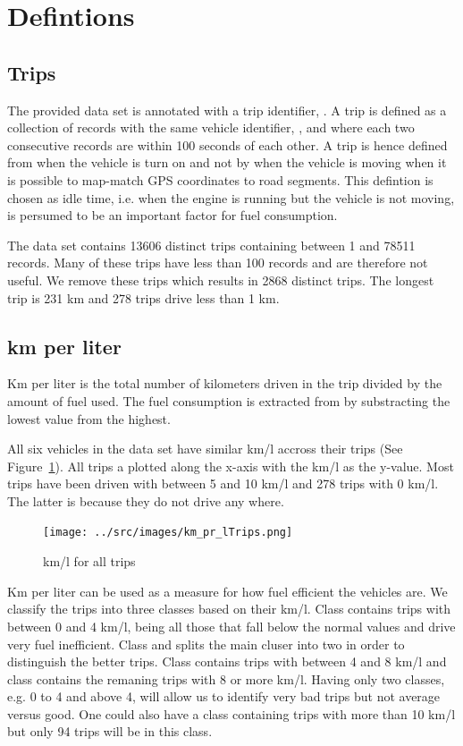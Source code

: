 \section{Defintions}
\subsection{Trips}
The provided data set is annotated with a trip identifier, \tid.
A trip is defined as a collection of records with the same vehicle identifier, \vid, and where each two consecutive records are within 100 seconds of each other.
A trip is hence defined from when the vehicle is turn on and not by when the vehicle is moving when it is possible to map-match GPS coordinates to road segments. 
This defintion is chosen as idle time, i.e. when the engine is running but the vehicle is not moving, is persumed to be an important factor for fuel consumption. 


The data set contains 13606 distinct trips containing between 1 and 78511 records. %
Many of these trips have less than 100 records and are therefore not useful. %
We remove these trips which results in 2868 distinct trips. %
The longest trip is 231 km and 278 trips drive less than 1 km. %


\subsection{km per liter}
Km per liter is the total number of kilometers driven in the trip divided by the amount of fuel used.
The fuel consumption is extracted from  by substracting the lowest value from the highest.

All six vehicles in the data set have similar km/l accross their trips (See Figure~\ref{fig:kmlTrips}).
All trips a plotted along the x-axis with the km/l as the y-value.
Most trips have been driven with between 5 and 10 km/l and 278 trips with 0 km/l. %
The latter is because they do not drive any where.
\begin{figure}[htb]
\centering
\texttt{[image: ../src/images/km\_pr\_lTrips.png]}
\caption{km/l for all trips}
\label{fig:kmlTrips}
\end{figure}

Km per liter can be used as a measure for how fuel efficient the vehicles are.
We classify the trips into three classes based on their km/l.
Class \fuelLow contains trips with between 0 and 4 km/l, being all those that fall below the normal values and drive very fuel inefficient.
Class \fuelMedium and \fuelHigh splits the main cluser into two in order to distinguish the better trips.
Class \fuelMedium contains trips with between 4 and 8 km/l and class \fuelHigh contains the remaning trips with 8 or more km/l.
Having only two classes, e.g. 0 to 4 and above 4, will allow us to identify very bad trips but not average versus good. 
One could also have a class containing trips with more than 10 km/l but only 94 trips will be in this class. %

